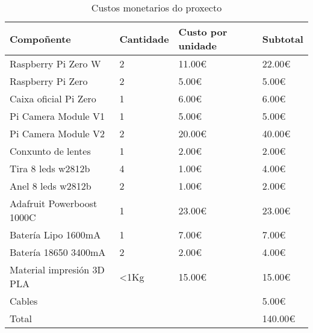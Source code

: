 \begin{table}[tb]
    \label{tab:custos_hardware}
    \caption{Custos monetarios do proxecto}
    \begin{center}
        \begin{tabular}{|l|l|l|l|}
            \hline
             Compoñente & Cantidade & Custo por unidade & Subtotal\\ \hline
             Raspberry Pi Zero W & 2 & 11.00€ & 22.00€ \\ \hline
             Raspberry Pi Zero & 2 & 5.00€ & 5.00€ \\ \hline
             Caixa oficial Pi Zero & 1 & 6.00€ & 6.00€ \\ \hline
             Pi Camera Module V1 & 1 & 5.00€ & 5.00€ \\ \hline
             Pi Camera Module V2 & 2 & 20.00€ & 40.00€ \\ \hline
             Conxunto de lentes & 1 & 2.00€ & 2.00€ \\ \hline
             Tira 8 leds w2812b & 4 & 1.00€ & 4.00€\\ \hline
             Anel 8 leds w2812b & 2 & 1.00€ & 2.00€ \\ \hline
             Adafruit Powerboost 1000C & 1 & 23.00€ & 23.00€ \\ \hline
             Batería Lipo 1600mA & 1 & 7.00€ & 7.00€\\ \hline
             Batería 18650 3400mA & 2 & 2.00€ & 4.00€ \\ \hline
             Material impresión 3D PLA & <1Kg & 15.00€ & 15.00€ \\ \hline
             Cables &  &  & 5.00€ \\ \hline
             Total &  &  & 140.00€ \\ \hline
        \end{tabular}
    \end{center}
\end{table}

